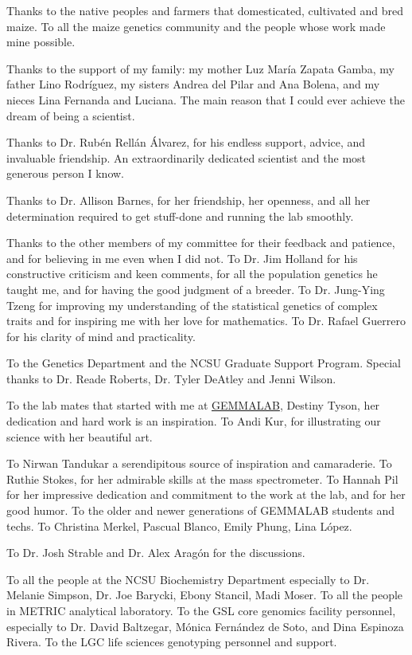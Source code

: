 \begin{acknowledgements}
Thanks to the native peoples and farmers that domesticated, cultivated and bred maize. 
To all the maize genetics community and the people whose work made mine possible. 

Thanks to the support of my family: 
my mother Luz María Zapata Gamba, my father Lino Rodríguez, my sisters Andrea del Pilar and Ana Bolena, and my nieces Lina Fernanda and Luciana.
The main reason that I could ever achieve the dream of being a scientist.

Thanks to Dr. Rubén Rellán Álvarez, for his endless support, advice, and invaluable friendship.
An extraordinarily dedicated scientist and the most generous person I know.

Thanks to Dr. Allison Barnes, for her friendship, her openness, and all her determination required to get stuff-done and running the lab smoothly.

Thanks to the other members of my committee for their feedback and patience,  and for believing in me even when I did not. 
To Dr. Jim Holland for his constructive criticism and keen comments, for all the population genetics he taught me, and for having the good judgment of a breeder. 
To Dr. Jung-Ying Tzeng for improving my understanding of the statistical genetics of complex traits and for inspiring me with her love for mathematics.
To Dr. Rafael Guerrero for his clarity of mind and practicality.

To the Genetics Department and the NCSU Graduate Support Program.
Special thanks to Dr. Reade Roberts,  Dr. Tyler DeAtley and Jenni Wilson.

To the lab mates that started with me at \href{https://www.gemmalab.org/people.html}{GEMMALAB}, Destiny Tyson, her dedication and hard work is an inspiration. 
To Andi Kur, for illustrating our science with her beautiful art.

To Nirwan Tandukar a serendipitous source of inspiration and camaraderie.
To Ruthie Stokes, for her admirable skills at the mass spectrometer.
To Hannah Pil for her impressive dedication and commitment to the work at the lab, and for her good humor.
To the older and newer generations of GEMMALAB students and techs. To Christina Merkel, Pascual Blanco, Emily Phung, Lina López.

To  Dr. Josh Strable and Dr. Alex Aragón for the discussions.

To all the people at the NCSU Biochemistry Department especially to Dr. Melanie Simpson, Dr. Joe Barycki, Ebony Stancil, Madi Moser. 
To all the people in  METRIC analytical laboratory. 
To the GSL core genomics facility personnel, especially to Dr. David Baltzegar,  Mónica Fernández de Soto, and Dina Espinoza Rivera.  
To the LGC life sciences genotyping personnel and support.


\end{acknowledgements}
